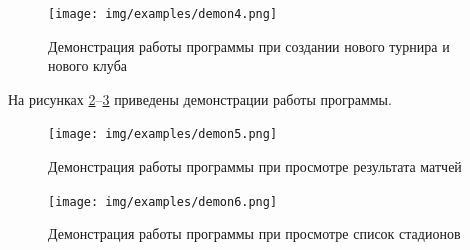 \begin{figure}[h]
	\centering
	\texttt{[image: img/examples/demon4.png]}
	\caption{Демонстрация работы программы при создании нового турнира и нового клуба}
	\label{img:ex3}
\end{figure}

\clearpage
На рисунках \ref{img:ex5}--\ref{img:ex6} приведены демонстрации работы программы.
\begin{figure}[h]
	\centering
	\texttt{[image: img/examples/demon5.png]}
	\caption{Демонстрация работы программы при просмотре результата матчей}
	\label{img:ex5}
\end{figure}

\begin{figure}[h]
	\centering
	\texttt{[image: img/examples/demon6.png]}
	\caption{Демонстрация работы программы при просмотре список стадионов}
	\label{img:ex6}
\end{figure}
\clearpage

